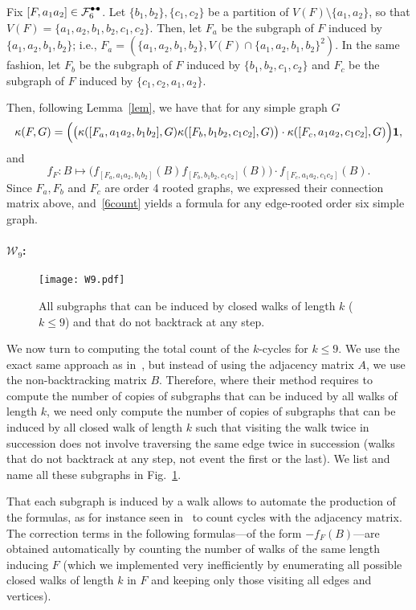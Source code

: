 \documentclass{article}
\theoremstyle{plain}
\begin{document}
Fix $[F,a_1a_2]\in \mathcal{F}_6^{\textcolor{black}{\bullet\!\!-\!\!\bullet}}$. Let $\{b_1,b_2\},\{c_1,c_2\}$ be a partition of $V(F)\setminus\{a_1,a_2\}$, so that $V(F) = \{a_1,a_2,b_1,b_2,c_1,c_2\}$. Then, let $F_a$ be the subgraph of $F$ induced by $\{a_1,a_2,b_1,b_2\}$; i.e., $F_a = (\{a_1,a_2,b_1,b_2\},V(F)\cap \{a_1,a_2,b_1,b_2\}^2)$. In the same fashion, let $F_b$ be the subgraph of $F$ induced by $\{b_1,b_2,c_1,c_2\}$ and $F_c$ be the subgraph of $F$ induced by $\{c_1,c_2,a_1,a_2\}$.

Then, following Lemma~\ref{lem}, we have that for any simple graph $G$
\[
\kappa(F,G) = \Big(\big(\kappa([F_a,a_1a_2,b_1b_2],G)\kappa([F_b,b_1b_2,c_1c_2],G)\big)\cdot\kappa([F_c,a_1a_2,c_1c_2],G)\Big){\bf 1},
\]
and
\begin{equation}\label{6count}
f_F : B\mapsto \big(f_{[F_a,a_1a_2,b_1b_2]}(B)f_{[F_b,b_1b_2,c_1c_2]}(B)\big)\cdot f_{[F_c,a_1a_2,c_1c_2]}(B).
\end{equation}
Since $F_a, F_b$ and $F_c$ are order 4 rooted graphs, we expressed their connection matrix above, and~\eqref{6count} yields a formula for any edge-rooted order six simple graph.
\paragraph{$\mathcal{W}_9$:}
\begin{figure}
\centering
\texttt{[image: W9.pdf]}
\caption{\label{FW9} All subgraphs that can be induced by closed walks of length $k$ ($k\leq 9$) and that do not backtrack at any step.}
\end{figure}

We now turn to computing the total count of the $k$-cycles for $k\leq 9$. We use the exact same approach as in~\cite{harary71cycle,alon1997cycles,perepeshko2009cycle}, but instead of using the adjacency matrix $A$, we use the non-backtracking matrix $B$. Therefore, where their method requires to compute the number of copies of subgraphs that can be induced by all walks of length $k$, we need only compute the number of copies of subgraphs that can be induced by all closed walk of length $k$ such that visiting the walk twice in succession does not involve traversing the same edge twice in succession (walks that do not backtrack at any step, not event the first or the last). We list and name all these subgraphs in Fig.~\ref{FW9}.

That each subgraph is induced by a walk allows to automate the production of the formulas, as for instance seen in~\cite{alon1997cycles,perepeshko2009cycle} to count cycles with the adjacency matrix. The correction terms in the following formulas---of the form $-f_F(B)$---are obtained automatically by counting the number of walks of the same length inducing $F$ (which we implemented very inefficiently by enumerating all possible closed walks of length $k$ in $F$ and keeping only those visiting all edges and vertices). 
\end{document}
